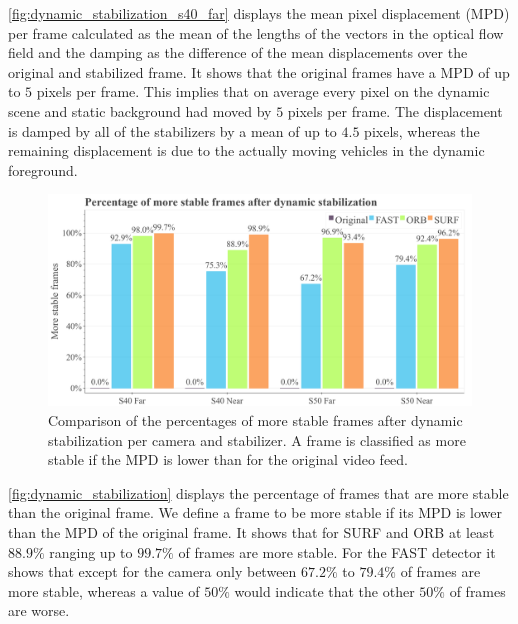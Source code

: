 \autoref{fig:dynamic_stabilization_s40_far} displays the mean pixel displacement (MPD) per frame calculated as the mean of the lengths of the vectors in the optical flow field and the damping as the difference of the mean displacements over the original and stabilized frame.
It shows that the original frames have a MPD of up to $5$ pixels per frame. This implies that on average every pixel on the dynamic scene and static background had moved by $5$ pixels per frame. 
The displacement is damped by all of the stabilizers by a mean of up to $4.5$ pixels, whereas the remaining displacement is due to the actually moving vehicles in the dynamic foreground.   

\begin{figure}[!ht]
      \includegraphics[width=\linewidth]{diagrams/optical_flow/stats.png}    
    \caption{
        Comparison of the percentages of more stable frames after dynamic stabilization per camera and stabilizer.
        A frame is classified as more stable if the MPD is lower than for the original video feed. 
    }
    \label{fig:dynamic_stabilization}
\end{figure}

\autoref{fig:dynamic_stabilization} displays the percentage of frames that are more stable than the original frame.
We define a frame to be more stable if its MPD is lower than the MPD of the original frame. 
It shows that for SURF and ORB at least $88.9\%$ ranging up to $99.7\%$ of frames are more stable.
For the FAST detector it shows that except for the  camera only between $67.2\%$ to $79.4\%$ of frames are more stable, whereas a value of $50\%$ would indicate that the other $50\%$ of frames are worse.  




